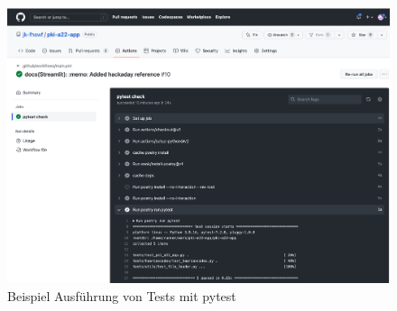 \documentclass{article}
\begin{document}
\begin{figure}[h]
	\begin{center}
 	\includegraphics[scale=0.40]{../images/ci_actions.png}
 	\caption{Beispiel Ausführung von Tests mit pytest}
	\end{center}
\end{figure}
\end{document}
